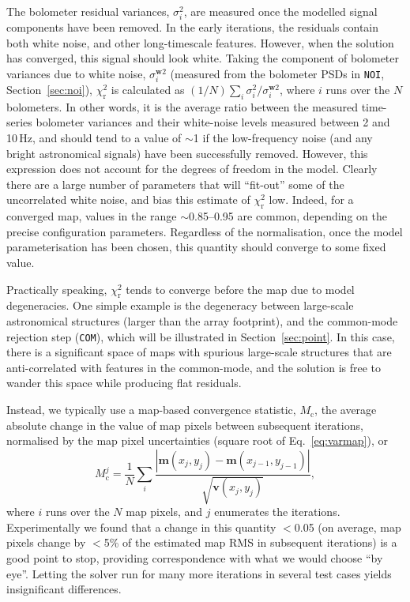 \documentclass[useAMS,usenatbib,nofootinbib]{mn2e}
\newcommand{\model}[1]{\texttt{#1}}
\begin{document}
The bolometer residual variances, $\sigma^2_i$, are measured once the
modelled signal components have been removed. In the early iterations,
the residuals contain both white noise, and other long-timescale
features. However, when the solution has converged, this signal should
look white. Taking the component of bolometer variances due to white
noise, $\sigma_i^{\mathbf{w}2}$ (measured from the bolometer PSDs in
\model{NOI}, Section~\ref{sec:noi}), $\chi^2_\mathrm{r}$ is calculated
as $(1/N) \sum_i \sigma^2_i / \sigma_i^{\mathbf{w}2}$, where $i$ runs
over the $N$ bolometers. In other words, it is the average ratio
between the measured time-series bolometer variances and their
white-noise levels measured between 2 and 10\,Hz, and should tend to a
value of $\sim$1 if the low-frequency noise (and any bright
astronomical signals) have been successfully removed. However, this
expression does not account for the degrees of freedom in the
model. Clearly there are a large number of parameters that will
``fit-out'' some of the uncorrelated white noise, and bias this
estimate of $\chi^2_\mathrm{r}$ low. Indeed, for a converged map,
values in the range $\sim$0.85--0.95 are common, depending on the
precise configuration parameters. Regardless of the normalisation,
once the model parameterisation has been chosen, this quantity should
converge to some fixed value.

Practically speaking, $\chi^2_\mathrm{r}$ tends to converge before the
map due to model degeneracies. One simple example is the degeneracy
between large-scale astronomical structures (larger than the array
footprint), and the common-mode rejection step (\model{COM}), which
will be illustrated in Section~\ref{sec:point}. In this case, there is
a significant space of maps with spurious large-scale structures that
are anti-correlated with features in the common-mode, and the solution
is free to wander this space while producing flat residuals.

Instead, we typically use a map-based convergence statistic,
$M_\mathrm{c}$, the average absolute change in the value of map pixels
between subsequent iterations, normalised by the map pixel
uncertainties (square root of Eq.~\ref{eq:varmap}), or
%
\begin{equation}
M^j_\mathrm{c} = \frac{1}{N} \sum_i \frac{| \mathbf{m}(x_j,y_j) -
  \mathbf{m}(x_{j-1},y_{j-1}) |} {\sqrt{\mathbf{v}(x_j,y_j)}} ,
\end{equation}
%
where $i$ runs over the $N$ map pixels, and $j$ enumerates the
iterations. Experimentally we found that a change in this quantity
$<$0.05 (on average, map pixels change by $<$5\% of the estimated map
RMS in subsequent iterations) is a good point to stop, providing
correspondence with what we would choose ``by eye''. Letting the
solver run for many more iterations in several test cases yields
insignificant differences.
\end{document}
